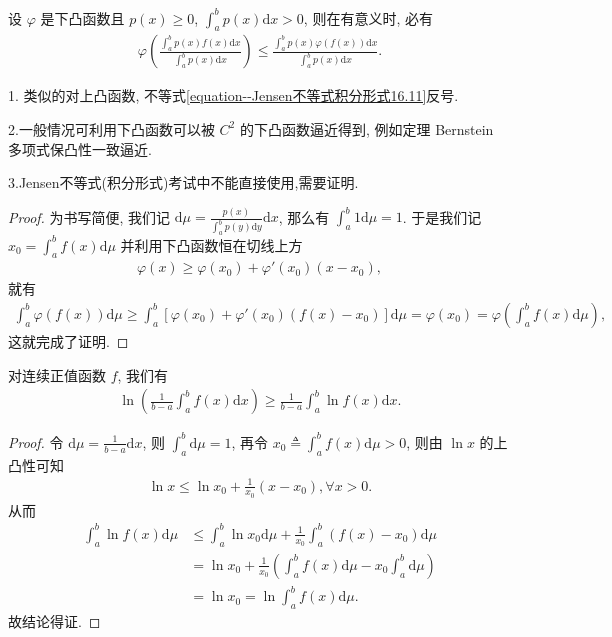 \documentclass[../../main.tex]{subfiles}
\begin{document}
\begin{theorem}\label{theorem:Jensen不等式积分形式}
设 $\varphi$ 是下凸函数且 $p(x) \geqslant 0$, $\int_a^b p(x) \mathrm{d}x > 0$, 则在有意义时, 必有
\begin{align}\label{equation--Jensen不等式积分形式16.11}
\varphi\left(\frac{\int_a^b p(x)f(x)\mathrm{d}x}{\int_a^b p(x)\mathrm{d}x}\right) \leqslant \frac{\int_a^b p(x)\varphi(f(x))\mathrm{d}x}{\int_a^b p(x)\mathrm{d}x}.
\end{align}
\end{theorem}
\begin{note}
1. 类似的对上凸函数, 不等式\eqref{equation--Jensen不等式积分形式16.11}反号.

2.一般情况可利用下凸函数可以被 $C^2$ 的下凸函数逼近得到, 例如定理 Bernstein 多项式保凸性一致逼近. 

3.Jensen不等式(积分形式)考试中不能直接使用,需要证明.
\end{note}
\begin{proof}
为书写简便, 我们记 $\mathrm{d}\mu = \frac{p(x)}{\int_a^b p(y)\mathrm{d}y}\mathrm{d}x$, 那么有 $\int_a^b 1\mathrm{d}\mu = 1$. 于是我们记 $x_0 = \int_a^b f(x)\mathrm{d}\mu$ 并利用下凸函数恒在切线上方
\begin{align*}
\varphi(x) \geqslant \varphi(x_0) + \varphi'(x_0)(x - x_0),
\end{align*}
就有
\begin{align*}
\int_a^b \varphi(f(x))\mathrm{d}\mu \geqslant \int_a^b [\varphi(x_0) + \varphi'(x_0)(f(x) - x_0)]\mathrm{d}\mu = \varphi(x_0) = \varphi\left(\int_a^b f(x)\mathrm{d}\mu\right),
\end{align*}
这就完成了证明. 

\end{proof}

\begin{example}
对连续正值函数 $f$, 我们有
\begin{align*}
\ln\left(\frac{1}{b - a}\int_a^b f(x)\mathrm{d}x\right) \geqslant \frac{1}{b - a}\int_a^b \ln f(x)\mathrm{d}x.
\end{align*} 
\end{example}
\begin{proof}
令 $\mathrm{d}\mu = \frac{1}{b - a}\mathrm{d}x$, 则 $\int_a^b \mathrm{d}\mu = 1$, 再令 $x_0 \triangleq \int_a^b f(x) \mathrm{d}\mu>0$, 则由 $\ln x$ 的上凸性可知
\begin{align*}
\ln x \leqslant \ln x_0 + \frac{1}{x_0}(x - x_0), \forall x > 0.
\end{align*}
从而
\begin{align*}
\int_a^b \ln f(x) \mathrm{d}\mu &\leqslant \int_a^b \ln x_0 \mathrm{d}\mu + \frac{1}{x_0}\int_a^b (f(x) - x_0) \mathrm{d}\mu \\
&= \ln x_0 + \frac{1}{x_0}\left(\int_a^b f(x) \mathrm{d}\mu - x_0\int_a^b \mathrm{d}\mu\right) \\
&= \ln x_0 = \ln \int_a^b f(x) \mathrm{d}\mu.
\end{align*}
故结论得证.

\end{proof}
\end{document}
